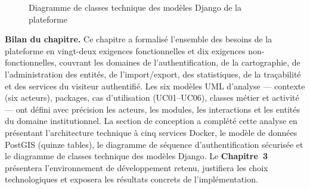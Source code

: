 \documentclass[12pt, a4paper]{report}
\begin{document}
\begin{figure}[htbp]
  \centering
  \caption{Diagramme de classes technique des modèles Django de la plateforme}
  \label{fig:diag-classes-tech}
\end{figure}

\medskip
\noindent\textbf{Bilan du chapitre.}
Ce chapitre a formalisé l'ensemble des besoins de la plateforme en
vingt-deux exigences fonctionnelles et dix exigences non-fonctionnelles,
couvrant les domaines de l'authentification, de la cartographie, de
l'administration des entités, de l'import/export, des statistiques, de la
traçabilité et des services du visiteur authentifié. Les six modèles UML
d'analyse --- contexte (six acteurs), packages, cas d'utilisation
(UC01--UC06), classes métier et activité --- ont défini avec précision les
acteurs, les modules, les interactions et les entités du domaine institutionnel.
La section de conception a complété cette analyse en présentant l'architecture
technique à cinq services Docker, le modèle de données PostGIS (quinze tables),
le diagramme de séquence d'authentification sécurisée et le diagramme de
classes technique des modèles Django.
Le \textbf{Chapitre~3} présentera l'environnement de développement retenu,
justifiera les choix technologiques et exposera les résultats concrets de
l'implémentation.

\clearpage


\clearpage
\printbibliography[heading=bibintoc, title={Références Bibliographiques}]
\end{document}
